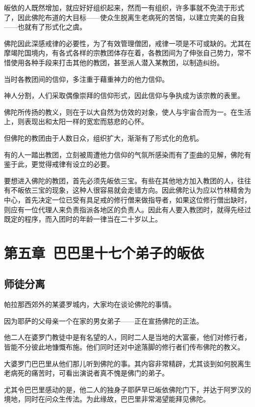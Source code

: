 \documentclass[twoside,openany]{book}
\begin{document}
皈依的人既然增加，就应好好组织起来，然而一有组织，许多事就不免流于形式了，因此佛陀布道的大目标——使众生脱离生老病死的苦恼，以建立完美的自我——也就有了形式化之虞。

佛陀因此深感戒律的必要性，为了有效管理僧团，戒律一项是不可或缺的。尤其在摩竭陀国境内，有各式各样的宗教团体存在着，各教团间为了伸张自己势力，常不惜使用各种手段来打击其他的教团，甚至派人潜入某教团，以制造纠纷。

当时各教团间的信仰，多注重于藉重神力的他力信仰。

神人分割，人们采取偶像崇拜的信仰形式，因此信仰与争执成为该宗教的表里。

佛陀所传扬的教义，则在于以大自然为仿效的对象，使人与宇宙合而为一。在生活上，则表现出和太阳一样的宽宏而慈悲的心怀。

但佛陀的教团由于人数日众，组织扩大，渐渐有了形式化的危机。

有的人一踏出教团，立刻被周遭他力信仰的气氛所感染而有了歪曲的见解，佛陀有鉴于此，更觉得戒律有设立的必要。

要想进入佛陀的教团，首先必须先皈依三宝。有些在其他地方加入教团的人，往往有不皈依三宝的现象，这种人很容易就会走错方向。因此佛陀认为应以竹林精舍为中心，首先决定一位已受有具足戒的修行僧来做指导者，如果这位修行僧出缺时，则应有一位代理人来负责指派各地区的负责人。因此有人要入教团时，就得先经过既定的程序，而入团时的年龄一律当在二十岁以上。

\chapter{第五章\ 巴巴里十七个弟子的皈依}\label{ch5}

\section{师徒分离}\label{sec5.1}

帕拉那西郊外的某婆罗城内，大家均在谈论佛陀的事情。

因为耶萨的父母亲一个在家的男女弟子——正在宣扬佛陀的正法。

他二人在婆罗门教徒中是有名望的人，同时二人是当地的大富豪，他们对修行者，皆能不分彼此地慷慨布施。他们同时还对中途落脚的修行者们传布佛陀的教义。

大婆罗门巴巴里从他们那儿听到佛陀的事。其内容非常精辟，尤其谈到如何脱离生老病死的痛苦时，可看出演说者真不愧是佛门的弟子。

尤其令巴巴里感动的是，他二人的独身子耶萨早已皈依佛陀门下，并达于阿罗汉的境地，同时在问众生传法。为此缘故，巴巴里非常渴望能拜见佛陀。
\end{document}
